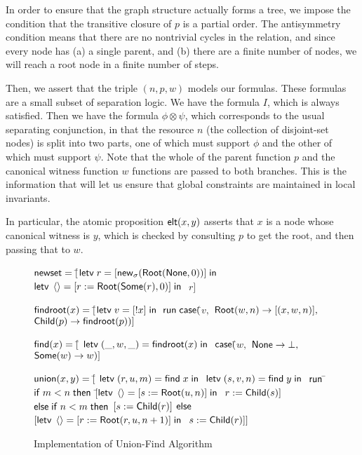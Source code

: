 In order to ensure that the graph structure actually forms a tree, we
impose the condition that the transitive closure of $p$ is a partial
order. The antisymmetry condition means that there are no nontrivial
cycles in the relation, and since every node has (a) a single parent,
and (b) there are a finite number of nodes, we will reach a root node
in a finite number of steps.

Then, we assert that the triple $(n, p, w)$ models our formulas.
These formulas are a small subset of separation logic. We have the
formula $I$, which is always satisfied. Then we have the formula $\phi
\otimes \psi$, which corresponds to the usual separating conjunction,
in that the resource $n$ (the collection of disjoint-set nodes) is
split into two parts, one of which must support $\phi$ and the other
of which must support $\psi$. Note that the whole of the parent
function $p$ and the canonical witness function $w$ functions are
passed to both branches. This is the information that will let us
ensure that global constraints are maintained in local invariants.

In particular, the atomic proposition $\mathsf{elt}({x}, {y})$ asserts that $x$ is
a node whose canonical witness is $y$, which is checked by consulting
$p$ to get the root, and then passing that to $w$.

\begin{figure}
\mbox{}
\begin{specification}
\nextline $\mathsf{newset} = [$\=$\mathsf{letv}\;r = [\mathsf{new}_{\sigma}(\mathsf{Root}(\mathsf{None}, 0))]\;\mathsf{in}\;$
\nextline              \>$\mathsf{letv}\;\left<\right> = [r := \mathsf{Root}(\mathsf{Some}(r), 0)]\;\mathsf{in}\;$
\nextline              \>$r]$

\nextline[1em] $\mathsf{findroot}(x) = [$\=$
                  \mathsf{letv}\;v = [!x]\;\mathsf{in}\;$ 
\nextline \>     $\mathsf{run}\;{}\mathsf{case}($\=$v,$ 
\nextline \> \>     $\mathsf{Root}(w, n) \to [(x, w, n)],$
\nextline \> \>     $\mathsf{Child}(p) \to \mathsf{findroot}(p))]$

\nextline[1em] $\mathsf{find}(x) = [$\=
             $\mathsf{letv}\;(\_, w, \_) = \mathsf{findroot}(x)\;\mathsf{in}\;$ 
\nextline \> $\mathsf{case}($\=$w,$ 
\nextline \> \> $\mathsf{None} \to \bot,$  
\nextline \> \> $\mathsf{Some}(w) \to w)]$

\nextline[1em] $\mathsf{union}(x, y) = [$\= 
                 $\mathsf{letv}\;(r, u, m) = \mathsf{find}\;x\;\mathsf{in}\;$ 
\nextline \>     $\mathsf{letv}\;(s, v, n) = \mathsf{find}\;y\;\mathsf{in}\;$ 
\nextline \>     $\mathsf{run}\;{}$\=$\mathsf{if}\;m < n\;\mathsf{then}$ 
\nextline \> \>   \;\;$[$\=$\mathsf{letv}\;\left<\right> = [s := \mathsf{Root}(u, n)]\;\mathsf{in}\;$ 
\nextline \> \>         \>$r := \mathsf{Child}(s)]$ 
\nextline \> \> $\mathsf{else}\;\mathsf{if}\;n < m\;\mathsf{then}$ 
\nextline \> \>   \;\;$[s := \mathsf{Child}(r)]$
\nextline \> \> $\mathsf{else}$ 
\nextline \> \>   \;\;$[\mathsf{letv}\;\left<\right> = [r := \mathsf{Root}(r, u, n+1)]\;\mathsf{in}\;$
\nextline \> \>      \>$s := \mathsf{Child}(r)]]$
\end{specification}
\caption{Implementation of Union-Find Algorithm}
\label{union-find:impl}  
\end{figure}

